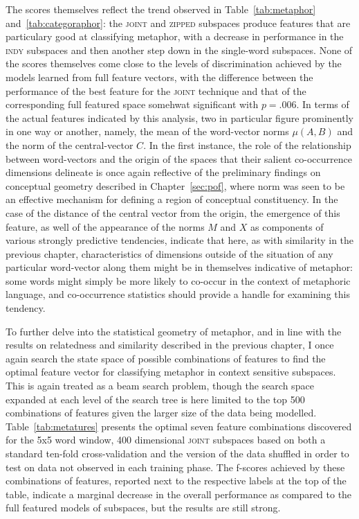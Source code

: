 The scores themselves reflect the trend observed in Table~\ref{tab:metaphor} and~\ref{tab:categoraphor}: the \textsc{joint} and \textsc{zipped} subspaces produce features that are particulary good at classifying metaphor, with a decrease in performance in the \textsc{indy} subspaces and then another step down in the single-word subspaces.  None of the scores themselves come close to the levels of discrimination achieved by the models learned from full feature vectors, with the difference between the performance of the best feature for the \textsc{joint} technique and that of the corresponding full featured space somehwat significant with $p = .006$.  In terms of the actual features indicated by this analysis, two in particular figure prominently in one way or another, namely, the mean of the word-vector norms $\mu(A,B)$ and the norm of the central-vector $C$.  In the first instance, the role of the relationship between word-vectors and the origin of the spaces that their salient co-occurrence dimensions delineate is once again reflective of the preliminary findings on conceptual geometry described in Chapter~\ref{sec:pof}, where norm was seen to be an effective mechanism for defining a region of conceptual constituency.  In the case of the distance of the central vector from the origin, the emergence of this feature, as well of the appearance of the norms $M$ and $X$ as components of various strongly predictive tendencies, indicate that here, as with similarity in the previous chapter, characteristics of dimensions outside of the situation of any particular word-vector along them might be in themselves indicative of metaphor: some words might simply be more likely to co-occur in the context of metaphoric language, and co-occurrence statistics should provide a handle for examining this tendency.

To further delve into the statistical geometry of metaphor, and in line with the results on relatedness and similarity described in the previous chapter, I once again search the state space of possible combinations of features to find the optimal feature vector for classifying metaphor in context sensitive subspaces.  This is again treated as a beam search problem, though the search space expanded at each level of the search tree is here limited to the top 500 combinations of features given the larger size of the data being modelled.  Table~\ref{tab:metatures} presents the optimal seven feature combinations discovered for the 5x5 word window, 400 dimensional \textsc{joint} subspaces based on both a standard ten-fold cross-validation and the version of the data shuffled in order to test on data not observed in each training phase.  The f-scores achieved by these combinations of features, reported next to the respective labels at the top of the table, indicate a marginal decrease in the overall performance as compared to the full featured models of subspaces, but the results are still strong.

